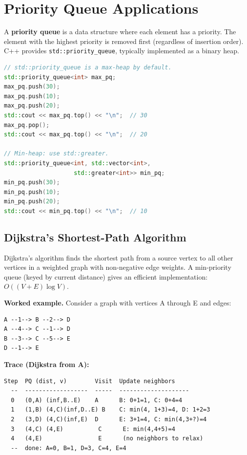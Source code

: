 \section{Priority Queue Applications}

A \textbf{priority queue} is a data structure where each element has a priority. The element with the highest priority is removed first (regardless of insertion order). C++ provides \texttt{std::priority\_queue}, typically implemented as a binary heap.

\begin{lstlisting}[language=C++]
// std::priority_queue is a max-heap by default.
std::priority_queue<int> max_pq;
max_pq.push(30);
max_pq.push(10);
max_pq.push(20);
std::cout << max_pq.top() << "\n";  // 30
max_pq.pop();
std::cout << max_pq.top() << "\n";  // 20

// Min-heap: use std::greater.
std::priority_queue<int, std::vector<int>,
                    std::greater<int>> min_pq;
min_pq.push(30);
min_pq.push(10);
min_pq.push(20);
std::cout << min_pq.top() << "\n";  // 10
\end{lstlisting}

\subsection{Dijkstra's Shortest-Path Algorithm}

Dijkstra's algorithm finds the shortest path from a source vertex to all other vertices in a weighted graph with non-negative edge weights. A min-priority queue (keyed by current distance) gives an efficient implementation: $O((V + E) \log V)$.

\textbf{Worked example.} Consider a graph with vertices A through E and edges:
\begin{verbatim}
A --1--> B --2--> D
A --4--> C --1--> D
B --3--> C --5--> E
D --1--> E
\end{verbatim}

\textbf{Trace (Dijkstra from A):}

\begin{verbatim}
Step  PQ (dist, v)        Visit  Update neighbors
  --  ------------------  -----  --------------------
  0   (0,A) (inf,B..E)    A      B: 0+1=1, C: 0+4=4
  1   (1,B) (4,C)(inf,D..E) B    C: min(4, 1+3)=4, D: 1+2=3
  2   (3,D) (4,C)(inf,E)  D      E: 3+1=4, C: min(4,3+?)=4
  3   (4,C) (4,E)          C      E: min(4,4+5)=4
  4   (4,E)                E      (no neighbors to relax)
  --  done: A=0, B=1, D=3, C=4, E=4
\end{verbatim}

